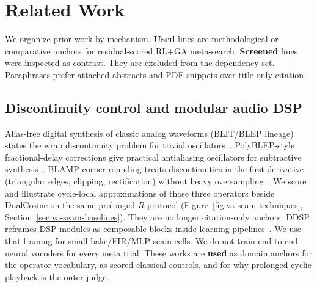 \section{Related Work}
\label{sec:related_work}

We organize prior work by mechanism.
\textbf{Used} lines are methodological or comparative anchors for residual-scored RL+GA meta-search.
\textbf{Screened} lines were inspected as contrast. They are excluded from the dependency set.
Paraphrases prefer attached abstracts and PDF snippets over title-only citation.

\subsection{Discontinuity control and modular audio DSP}
Alias-free digital synthesis of classic analog waveforms (BLIT/BLEP lineage) states the wrap discontinuity problem for trivial oscillators~\cite{stilson1996}.
PolyBLEP-style fractional-delay corrections give practical antialiasing oscillators for subtractive synthesis~\cite{nam2009polyblep}.
BLAMP corner rounding treats discontinuities in the first derivative (triangular edges, clipping, rectification) without heavy oversampling~\cite{esqueda2016blamp}.
We score and illustrate cycle-local approximations of those three operators beside DualCosine on the same prolonged-$R$ protocol (Figure~\ref{fig:va-seam-techniques}, Section~\ref{sec:va-seam-baselines}).
They are no longer citation-only anchors.
DDSP reframes DSP modules as composable blocks inside learning pipelines~\cite{engel2020}.
We use that framing for small bake/FIR/MLP seam cells.
We do not train end-to-end neural vocoders for every meta trial.
These works are \textbf{used} as domain anchors for the operator vocabulary, as scored classical controls, and for why prolonged cyclic playback is the outer judge.

